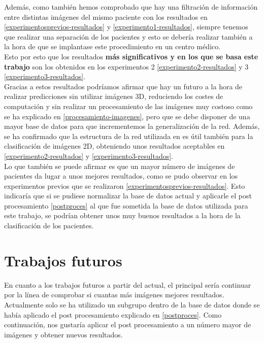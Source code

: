 Además, como también hemos comprobado que hay una filtración de información entre distintas imágenes del mismo paciente con los resultados en \ref{experimentosprevios-resultados} y \ref{experimento1-resultados}, siempre tenemos que realizar una separación de los pacientes y esto se debería realizar también a la hora de que se implantase este procedimiento en un centro médico. \\

Esto por esto que los resultados \textbf{más significativos y en los que se basa este trabajo} son los obtenidos en los experimentos 2 \ref{experimento2-resultados} y 3 \ref{experimento3-resultados}.\\

Gracias a estos resultados podríamos afirmar que hay un futuro a la hora de realizar predicciones sin utilizar imágenes 3D, reduciendo los costes de computación y sin realizar un procesamiento de las imágenes muy costoso como se ha explicado en \ref{procesamiento-imagenes}, pero que se debe disponer de una mayor base de datos para que incrementemos la generalización de la red. Además, se ha confirmado que la estructura de la red utilizada en \cite{residualVGG} es útil también para la clasificación de imágenes 2D, obteniendo unos resultados aceptables en \ref{experimento2-resultados} y \ref{experimento3-resultados}.\\

Lo que también se puede afirmar es que un mayor número de imágenes de pacientes da lugar a unos mejores resultados, como se pudo observar en los experimentos previos que se realizaron \ref{experimentosprevios-resultados}. Esto indicaría que si se pudiese normalizar la base de datos actual y aplicarle el post procesamiento \ref{postproces} al que fue sometida la base de datos utilizada para este trabajo, se podrían obtener unos muy buenos resultados a la hora de la clasificación de los pacientes.\\

\section{Trabajos futuros}

En cuanto a los trabajos futuros a partir del actual, el principal sería continuar por la línea de comprobar si cuantas más imágenes mejores resultados. Actualmente solo se ha utilizado un subgrupo dentro de la base de datos donde se había aplicado el post procesamiento explicado en \ref{postproces}. Como continuación, nos gustaría aplicar el post procesamiento a un número mayor de imágenes y obtener nuevos resultados.\\

